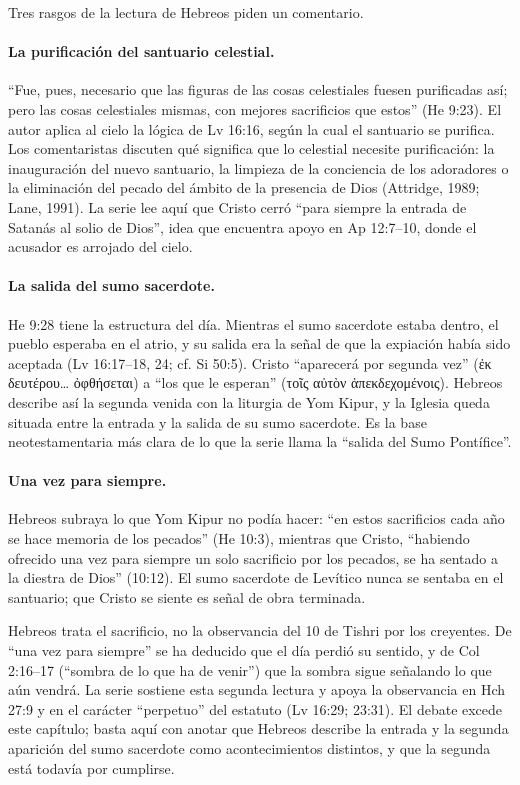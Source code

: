 \documentclass[11pt,letterpaper]{article}
\newcommand{\grc}[1]{\foreignlanguage{ancientgreek}{#1}}
\begin{document}
Tres rasgos de la lectura de Hebreos piden un comentario.

\paragraph{La purificación del santuario celestial.} ``Fue, pues, necesario que las figuras de las cosas celestiales fuesen purificadas así; pero las cosas celestiales mismas, con mejores sacrificios que estos'' (He 9:23). El autor aplica al cielo la lógica de Lv 16:16, según la cual el santuario se purifica. Los comentaristas discuten qué significa que lo celestial necesite purificación: la inauguración del nuevo santuario, la limpieza de la conciencia de los adoradores o la eliminación del pecado del ámbito de la presencia de Dios (Attridge, 1989; Lane, 1991). La serie lee aquí que Cristo cerró ``para siempre la entrada de Satanás al solio de Dios'', idea que encuentra apoyo en Ap 12:7--10, donde el acusador es arrojado del cielo.

\paragraph{La salida del sumo sacerdote.} He 9:28 tiene la estructura del día. Mientras el sumo sacerdote estaba dentro, el pueblo esperaba en el atrio, y su salida era la señal de que la expiación había sido aceptada (Lv 16:17--18, 24; cf. Si 50:5). Cristo ``aparecerá por segunda vez'' (\grc{ἐκ δευτέρου\ldots{} ὀφθήσεται}) a ``los que le esperan'' (\grc{τοῖς αὐτὸν ἀπεκδεχομένοις}). Hebreos describe así la segunda venida con la liturgia de Yom Kipur, y la Iglesia queda situada entre la entrada y la salida de su sumo sacerdote. Es la base neotestamentaria más clara de lo que la serie llama la ``salida del Sumo Pontífice''.

\paragraph{Una vez para siempre.} Hebreos subraya lo que Yom Kipur no podía hacer: ``en estos sacrificios cada año se hace memoria de los pecados'' (He 10:3), mientras que Cristo, ``habiendo ofrecido una vez para siempre un solo sacrificio por los pecados, se ha sentado a la diestra de Dios'' (10:12). El sumo sacerdote de Levítico nunca se sentaba en el santuario; que Cristo se siente es señal de obra terminada.

\begin{nota}
Hebreos trata el sacrificio, no la observancia del 10 de Tishri por los creyentes. De ``una vez para siempre'' se ha deducido que el día perdió su sentido, y de Col 2:16--17 (``sombra de lo que ha de venir'') que la sombra sigue señalando lo que aún vendrá. La serie sostiene esta segunda lectura y apoya la observancia en Hch 27:9 y en el carácter ``perpetuo'' del estatuto (Lv 16:29; 23:31). El debate excede este capítulo; basta aquí con anotar que Hebreos describe la entrada y la segunda aparición del sumo sacerdote como acontecimientos distintos, y que la segunda está todavía por cumplirse.
\end{nota}
\end{document}
